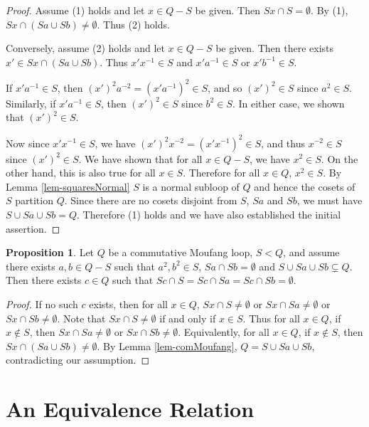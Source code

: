 \documentclass[12pt, twoside, openright]{report}
\theoremstyle{definition}
\newtheorem{prp}[thm]{Proposition}
\begin{document}
\begin{proof}
  Assume (1) holds and let $x\in Q- S$ be given. Then $Sx\cap S = \emptyset$. By (1),
    $Sx\cap (Sa\cup Sb)\neq \emptyset$. Thus (2) holds.
  
  Conversely, assume (2) holds and let $x\in Q- S$ be given. Then there exists
    $x'\in Sx\cap (Sa\cup Sb)$. Thus $x'x^{-1}\in S$ and $x'a^{-1}\in S$ or $x'b^{-1}\in S$.
  
  If $x'a^{-1}\in S$, then $(x')^2 a^{-2} = (x'a^{-1})^2\in S$, and so $(x')^2\in S$ since
    $a^2\in S$. Similarly, if $x'a^{-1}\in S$, then $(x')^2\in S$ since $b^2\in S$. In either
    case, we shown that $(x')^2\in S$.
  
  Now since $x'x^{-1}\in S$, we have $(x')^2 x^{-2} = (x'x^{-1})^2\in S$, and thus $x^{-2}\in S$
    since $(x')^2\in S$. We have shown that for all $x\in Q - S$, we have $x^2\in S$. On the other
    hand, this is also true for all $x\in S$. Therefore for all $x\in Q$, $x^2\in S$. By Lemma
    \ref{lem-squaresNormal} $S$ is a normal subloop of $Q$ and hence the cosets of $S$ partition $Q$.
    Since there are no cosets disjoint from $S$, $Sa$ and $Sb$, we must have $S\cup Sa\cup Sb = Q$.
    Therefore (1) holds and we have also established the initial assertion.
\end{proof}

\begin{prp}
  Let $Q$ be a commutative Moufang loop, $S < Q$, and assume there exists $a,b\in Q- S$ such that
    $a^2,b^2\in S$, $Sa\cap Sb=\emptyset$ and $S\cup Sa\cup Sb \subsetneq Q$. Then there exists
    $c\in Q$ such that $Sc\cap S = Sc\cap Sa = Sc\cap Sb = \emptyset$.
\end{prp}

\begin{proof}
  If no such $c$ exists, then for all $x\in Q$, $Sx\cap S \neq \emptyset$ or
    $Sx\cap Sa \neq \emptyset$ or $Sx\cap Sb\neq \emptyset$. Note that
    $Sx\cap S\neq\emptyset$ if and only if $x\in S$. Thus for all $x\in Q$, if $x\not\in S$,
    then $Sx\cap Sa\neq\emptyset$ or $Sx\cap Sb\neq\emptyset$. Equivalently, for all $x\in Q$,
    if $x\not\in S$, then $Sx\cap (Sa\cup Sb)\neq \emptyset$. By Lemma \ref{lem-comMoufang},
    $Q = S\cup Sa\cup Sb$, contradicting our assumption.
\end{proof}

\section{An Equivalence Relation}
\end{document}
